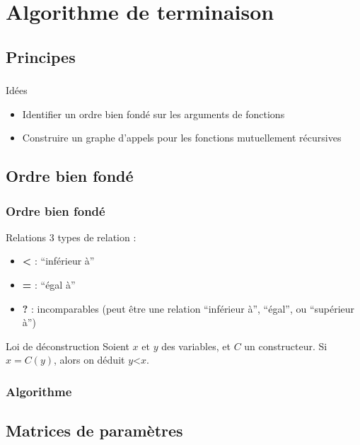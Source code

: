 \section{Algorithme de terminaison}

\subsection{Principes}

\begin{frame}
  \frametitle{}
  \begin{block}{Idées}
    \begin{itemize}
      \item Identifier un ordre bien fondé sur les arguments de fonctions
      \item Construire un graphe d'appels pour les fonctions
        mutuellement récursives
    \end{itemize}
  \end{block}
\end{frame}

\subsection{Ordre bien fondé}

\begin{frame}
  \frametitle{Ordre bien fondé}
  \begin{block}{Relations}
    3 types de relation :
    \begin{itemize}
    \item \textbf{<} : ``inférieur à''
    \item \textbf{=} : ``égal à''
    \item \textbf{?} : incomparables (peut être une relation ``inférieur à'', ``égal'', ou ``supérieur à'')
    \end{itemize}
  \end{block}
  \begin{block}{Loi de déconstruction}
    Soient $x$ et $y$ des variables, et $C$ un constructeur. Si $x = C(y)$, alors on déduit $y \textbf{<} x$.
  \end{block}
\end{frame}

\begin{frame}
  \frametitle{Algorithme}
\end{frame}

\subsection{Matrices de paramètres}

